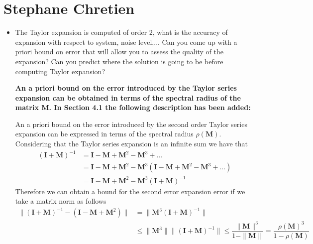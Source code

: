 \documentclass[11pt]{article}
\begin{document}
\section*{Stephane Chretien}

\begin{itemize}
	\item The Taylor expansion is computed of order 2, what is the accuracy of expansion with respect to system, noise level,... Can you come up with a priori bound on error that will allow you to assess the quality of the expansion? Can you predict where the solution is going to be before computing Taylor expansion?
	
	{\bfseries An a priori bound on the error introduced by the Taylor series expansion can be obtained in terms of the spectral radius of the matrix $\mathbf{M}$. In Section 4.1 the following description has been added: }
	
    \color{blue} An a priori bound on the error introduced by the second order Taylor series expansion can be expressed in terms of the spectral radius $\rho(\mathbf{M})$.
    Considering that the Taylor series expansion is an infinite sum we have that
    \begin{equation} \tag{4.4} \begin{aligned} (\mathbf{I} + \mathbf{M})^{-1} &= \mathbf{I} - \mathbf{M} + \mathbf{M}^2 - \mathbf{M}^3 + \ldots \\
    &=  \mathbf{I} - \mathbf{M} + \mathbf{M}^2 - \mathbf{M}^3 \left( \mathbf{I} - \mathbf{M} + \mathbf{M}^2 - \mathbf{M}^3 + \ldots \right) \\
    &=  \mathbf{I} - \mathbf{M} + \mathbf{M}^2 - \mathbf{M}^3  (\mathbf{I} + \mathbf{M})^{-1} \end{aligned} \end{equation} 
    Therefore we can obtain a bound for the second error expansion error if we take a matrix norm as follows
    \begin{equation} \tag{4.5} \begin{aligned} \| (\mathbf{I} + \mathbf{M})^{-1} - ( \mathbf{I} - \mathbf{M} + \mathbf{M}^2 ) \| &=  \| \mathbf{M}^3  (\mathbf{I} + \mathbf{M})^{-1} \| \\
    & \leq \| \mathbf{M}^3 \| \| (\mathbf{I} + \mathbf{M})^{-1} \| \leq \dfrac{\| \mathbf{M} \|^3}{ 1 -  \| \mathbf{M} \|} = \dfrac{\rho(\mathbf{M})^3}{1 - \rho(\mathbf{M})}  \end{aligned} \end{equation} 
	\color{black}
	

\end{itemize}
\end{document}
